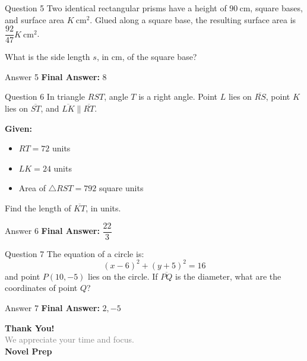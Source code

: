\documentclass{beamer}
\begin{document}
\begin{frame}{Question 5}
\small
Two identical rectangular prisms have a height of \(90\ \text{cm}\), square bases, and surface area \(K\ \text{cm}^2\). Glued along a square base, the resulting surface area is \(\dfrac{92}{47}K\ \text{cm}^2\).

What is the side length \(s\), in cm, of the square base?
\end{frame}
\begin{frame}{Answer 5}
\small
\textbf{Final Answer:} $\boxed{8}$
\end{frame}

\begin{frame}{Question 6}
\small
In triangle \(RST\), angle \(T\) is a right angle. Point \(L\) lies on \(\overline{RS}\), point \(K\) lies on \(\overline{ST}\), and \(\overline{LK} \parallel \overline{RT}\).

\textbf{Given:}
\begin{itemize}
\item \(RT = 72\) units
\item \(LK = 24\) units
\item Area of \(\triangle RST = 792\) square units
\end{itemize}

Find the length of \(\overline{KT}\), in units.
\end{frame}
\begin{frame}{Answer 6}
\small
\textbf{Final Answer:} $\boxed{\dfrac{22}{3}}$
\end{frame}

\begin{frame}{Question 7}
\small
The equation of a circle is:
\[
(x - 6)^2 + (y + 5)^2 = 16
\]
and point \(P(10, -5)\) lies on the circle. If \(\overline{PQ}\) is the diameter, what are the coordinates of point \(Q\)?
\end{frame}
\begin{frame}{Answer 7}
\small
\textbf{Final Answer:} $\boxed{2, -5}$
\end{frame}

\begin{frame}{}
    \centering
    \vspace{5em}
    {\Huge \textbf{\textcolor{novelPurple}{Thank You!}}} \\[1em]
    {\large \textcolor{gray}{We appreciate your time and focus.}} \\[3em]
    {\LARGE \textbf{\textcolor{novelPurple}{\textsf{Novel Prep}}}}
    \vfill
\end{frame}
\end{document}
